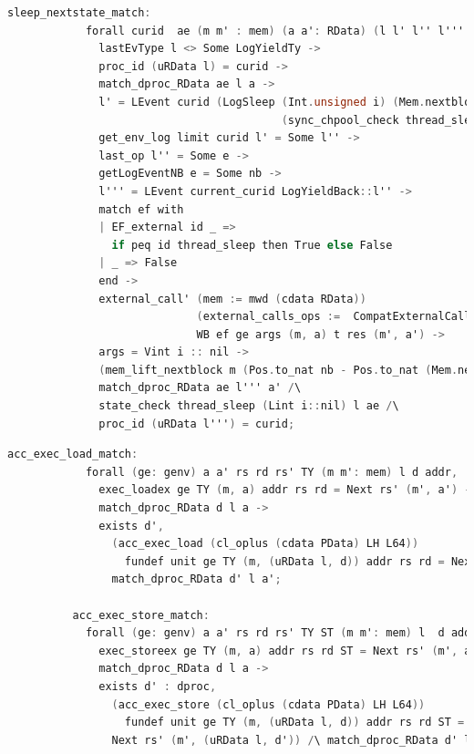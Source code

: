 \begin{lstlisting}[language=C]
          sleep_nextstate_match:
            forall curid  ae (m m' : mem) (a a': RData) (l l' l'' l''': Log) e nb WB ef (ge : genv) args m t res i,
              lastEvType l <> Some LogYieldTy ->
              proc_id (uRData l) = curid ->
              match_dproc_RData ae l a ->
              l' = LEvent curid (LogSleep (Int.unsigned i) (Mem.nextblock m)
                                          (sync_chpool_check thread_sleep (Lint i::nil) (uRData l) ae))::l ->
              get_env_log limit curid l' = Some l'' ->
              last_op l'' = Some e ->
              getLogEventNB e = Some nb -> 
              l''' = LEvent current_curid LogYieldBack::l'' ->
              match ef with 
              | EF_external id _ =>
                if peq id thread_sleep then True else False 
              | _ => False
              end ->
              external_call' (mem := mwd (cdata RData)) 
                             (external_calls_ops :=  CompatExternalCalls.compatlayer_extcall_ops (phthread <@$\oplus$@>  L64))
                             WB ef ge args (m, a) t res (m', a') ->
              args = Vint i :: nil ->
              (mem_lift_nextblock m (Pos.to_nat nb - Pos.to_nat (Mem.nextblock m)) = m') /\
              match_dproc_RData ae l''' a' /\
              state_check thread_sleep (Lint i::nil) l ae /\
              proc_id (uRData l''') = curid;
\end{lstlisting}

\begin{lstlisting}[language=C]
          acc_exec_load_match:
            forall (ge: genv) a a' rs rd rs' TY (m m': mem) l d addr,
              exec_loadex ge TY (m, a) addr rs rd = Next rs' (m', a') ->
              match_dproc_RData d l a ->
              exists d',
                (acc_exec_load (cl_oplus (cdata PData) LH L64)) 
                  fundef unit ge TY (m, (uRData l, d)) addr rs rd = Next rs' (m', (uRData l, d')) /\
                match_dproc_RData d' l a';

          acc_exec_store_match:
            forall (ge: genv) a a' rs rd rs' TY ST (m m': mem) l  d addr,           
              exec_storeex ge TY (m, a) addr rs rd ST = Next rs' (m', a') ->
              match_dproc_RData d l a ->
              exists d' : dproc,
                (acc_exec_store (cl_oplus (cdata PData) LH L64)) 
                  fundef unit ge TY (m, (uRData l, d)) addr rs rd ST =
                Next rs' (m', (uRData l, d')) /\ match_dproc_RData d' l a';
\end{lstlisting}

